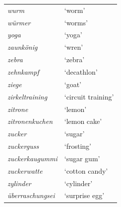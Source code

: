 \begin{longtable}{ll}
\textit{wurm} & `worm' \\
\textit{würmer} & `worms' \\
\textit{yoga} & `yoga' \\
\textit{zaunkönig} & `wren' \\
\textit{zebra} & `zebra' \\
\textit{zehnkampf} & `decathlon' \\
\textit{ziege} & `goat' \\
\textit{zirkeltraining} & `circuit training' \\
\textit{zitrone} & `lemon' \\
\textit{zitronenkuchen} & `lemon cake' \\
\textit{zucker} & `sugar' \\
\textit{zuckerguss} & `frosting' \\
\textit{zuckerkaugummi} & `sugar gum' \\
\textit{zuckerwatte} & `cotton candy' \\
\textit{zylinder} & `cylinder' \\
\textit{überraschungsei} & `surprise egg' \\
\bottomrule
\end{longtable}